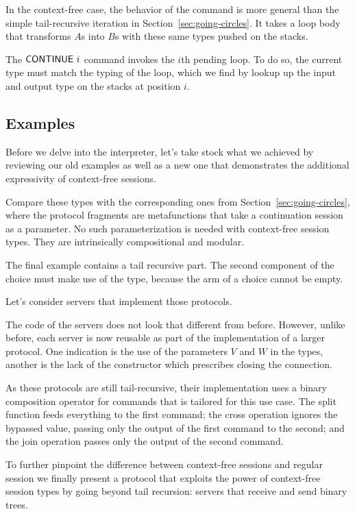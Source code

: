 \documentclass[acmsmall,screen,anonymous,review]{acmart}
\begin{document}
In the context-free case, the behavior of the {\AMU} command is more
general than the simple tail-recursive iteration in
Section~\ref{sec:going-circles}. It takes a loop body that transforms
$A$s into $B$s with these same types pushed on the stacks.

The {$\ACONTINUE~i$} command invokes the $i$th pending loop. To do so,
the current type must match the typing of the loop, which we find by
lookup up the input and output type on the stacks at position $i$.

\subsection{Examples}
\label{sec:examples}



Before we delve into the interpreter, let's take stock what we
achieved by reviewing our old examples as well as a new one that
demonstrates the additional expressivity of context-free sessions.
\cstBinaryp

Compare these types with the corresponding ones from
Section~\ref{sec:going-circles}, where the protocol fragments are
metafunctions that take a continuation session as a parameter. No such
parameterization is needed with context-free session types. They are
intrinsically compositional and modular.

The final example {\Amanyunaryp} contains a tail recursive part. The
second component of the choice must make use of the {\Atcfskip} type,
because the arm of a choice cannot be empty.

Let's consider servers that implement those protocols.
\cstCmdExamples

The code of the servers does not look that different from
before. However, unlike before, each server is now reusable as part of
the implementation of a larger protocol. One indication is the use of
the parameters $V$ and $W$ in the types, another is the lack of the
{\ACEND} constructor which prescribes closing the connection.

As these protocols are still tail-recursive, their implementation uses
a binary composition operator for commands that is tailored for this
use case. The split function feeds everything to the first command; the
cross operation ignores the bypassed value, passing only the output of
the first command to the second; and the join operation passes only
the output of the second command.
\cstTailComposition


To further pinpoint the difference between context-free sessions and
regular session we finally present a protocol that
exploits the power of context-free session types by going beyond tail
recursion: servers that receive and send binary trees. 
\cstTreep
\end{document}
